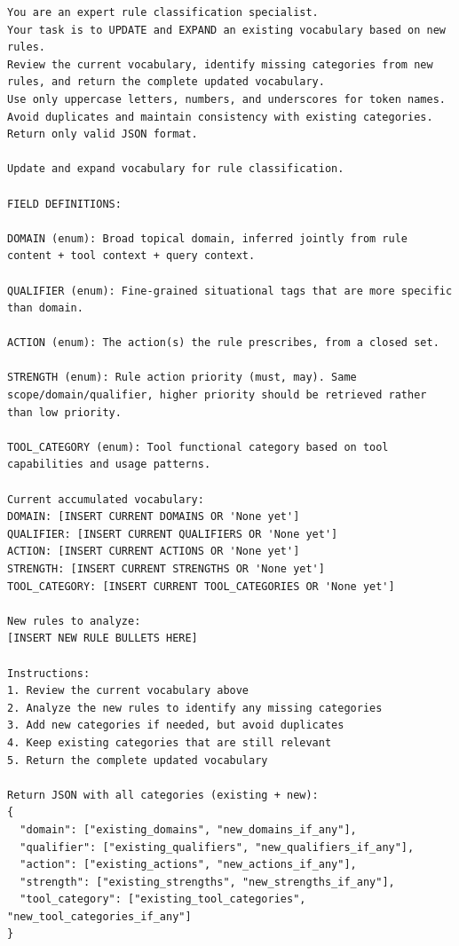 \begin{lstlisting}[style=promptstyle, caption={Prompt used to update and expand the rule classification vocabulary using newly generated rules.}]
You are an expert rule classification specialist.
Your task is to UPDATE and EXPAND an existing vocabulary based on new rules.
Review the current vocabulary, identify missing categories from new rules, and return the complete updated vocabulary.
Use only uppercase letters, numbers, and underscores for token names.
Avoid duplicates and maintain consistency with existing categories.
Return only valid JSON format.

Update and expand vocabulary for rule classification.

FIELD DEFINITIONS:

DOMAIN (enum): Broad topical domain, inferred jointly from rule content + tool context + query context.

QUALIFIER (enum): Fine-grained situational tags that are more specific than domain.

ACTION (enum): The action(s) the rule prescribes, from a closed set.

STRENGTH (enum): Rule action priority (must, may). Same scope/domain/qualifier, higher priority should be retrieved rather than low priority.

TOOL_CATEGORY (enum): Tool functional category based on tool capabilities and usage patterns.

Current accumulated vocabulary:
DOMAIN: [INSERT CURRENT DOMAINS OR 'None yet']
QUALIFIER: [INSERT CURRENT QUALIFIERS OR 'None yet']
ACTION: [INSERT CURRENT ACTIONS OR 'None yet']
STRENGTH: [INSERT CURRENT STRENGTHS OR 'None yet']
TOOL_CATEGORY: [INSERT CURRENT TOOL_CATEGORIES OR 'None yet']

New rules to analyze:
[INSERT NEW RULE BULLETS HERE]

Instructions:
1. Review the current vocabulary above
2. Analyze the new rules to identify any missing categories
3. Add new categories if needed, but avoid duplicates
4. Keep existing categories that are still relevant
5. Return the complete updated vocabulary

Return JSON with all categories (existing + new):
{
  "domain": ["existing_domains", "new_domains_if_any"],
  "qualifier": ["existing_qualifiers", "new_qualifiers_if_any"],
  "action": ["existing_actions", "new_actions_if_any"],
  "strength": ["existing_strengths", "new_strengths_if_any"],
  "tool_category": ["existing_tool_categories", "new_tool_categories_if_any"]
}
\end{lstlisting}












